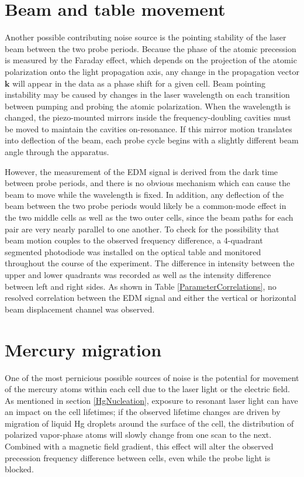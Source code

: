 \documentclass [10pt, twoside] {uwthesis}[2012/04/02]
\begin{document}
\section{Beam and table movement} %
Another possible contributing noise source is the pointing stability of the laser beam between the two probe periods. Because the phase of the atomic precession is measured by the Faraday effect, which depends on the projection of the atomic polarization onto the light propagation axis, any change in the propagation vector $\mathbf{k}$ will appear in the data as a phase shift for a given cell. Beam pointing instability may be caused by changes in the laser wavelength on each transition between pumping and probing the atomic polarization. When the wavelength is changed, the piezo-mounted mirrors inside the frequency-doubling cavities must be moved to maintain the cavities on-resonance. If this mirror motion translates into deflection of the beam, each probe cycle begins with a slightly different beam angle through the apparatus.

However, the measurement of the EDM signal is derived from the dark time between probe periods, and there is no obvious mechanism which can cause the beam to move while the wavelength is fixed. In addition, any deflection of the beam between the two probe periods would likely be a common-mode effect in the two middle cells as well as the two outer cells, since the beam paths for each pair are very nearly parallel to one another. To check for the possibility that beam motion couples to the observed frequency difference, a 4-quadrant segmented photodiode was installed on the optical table and monitored throughout the course of the experiment. The difference in intensity between the upper and lower quadrants was recorded as well as the intensity difference between left and right sides. As shown in Table \ref{ParameterCorrelations}, no resolved correlation between the EDM signal and either the vertical or horizontal beam displacement channel was observed.  

\section{Mercury migration} %
One of the most pernicious possible sources of noise is the potential for movement of the mercury atoms within each cell due to the laser light or the electric field. As mentioned in section \ref{HgNucleation}, exposure to resonant laser light can have an impact on the cell lifetimes; if the observed lifetime changes are driven by migration of liquid Hg droplets around the surface of the cell, the distribution of polarized vapor-phase atoms will slowly change from one scan to the next. Combined with a magnetic field gradient, this effect will alter the observed precession frequency difference between cells, even while the probe light is blocked. 
\end{document}
